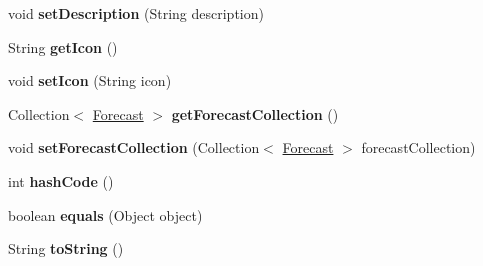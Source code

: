 \begin{DoxyCompactItemize}
\item 
\hypertarget{classit_1_1polimi_1_1se_1_1calcare_1_1entities_1_1WeatherCondition_a857fa008a9f13c5f423520469976ab4a}{}void {\bfseries set\+Description} (String description)\label{classit_1_1polimi_1_1se_1_1calcare_1_1entities_1_1WeatherCondition_a857fa008a9f13c5f423520469976ab4a}

\item 
\hypertarget{classit_1_1polimi_1_1se_1_1calcare_1_1entities_1_1WeatherCondition_a0b5248c9fa248809e6a6487f71656d75}{}String {\bfseries get\+Icon} ()\label{classit_1_1polimi_1_1se_1_1calcare_1_1entities_1_1WeatherCondition_a0b5248c9fa248809e6a6487f71656d75}

\item 
\hypertarget{classit_1_1polimi_1_1se_1_1calcare_1_1entities_1_1WeatherCondition_a74ddfcb08d6757ef6203a9dfe2c38b97}{}void {\bfseries set\+Icon} (String icon)\label{classit_1_1polimi_1_1se_1_1calcare_1_1entities_1_1WeatherCondition_a74ddfcb08d6757ef6203a9dfe2c38b97}

\item 
\hypertarget{classit_1_1polimi_1_1se_1_1calcare_1_1entities_1_1WeatherCondition_ad6822dfbce9197d2bb8b2c3a6c3dd95b}{}Collection$<$ \hyperlink{classit_1_1polimi_1_1se_1_1calcare_1_1entities_1_1Forecast}{Forecast} $>$ {\bfseries get\+Forecast\+Collection} ()\label{classit_1_1polimi_1_1se_1_1calcare_1_1entities_1_1WeatherCondition_ad6822dfbce9197d2bb8b2c3a6c3dd95b}

\item 
\hypertarget{classit_1_1polimi_1_1se_1_1calcare_1_1entities_1_1WeatherCondition_a3672929152fa52e16d87f8f5c4892b71}{}void {\bfseries set\+Forecast\+Collection} (Collection$<$ \hyperlink{classit_1_1polimi_1_1se_1_1calcare_1_1entities_1_1Forecast}{Forecast} $>$ forecast\+Collection)\label{classit_1_1polimi_1_1se_1_1calcare_1_1entities_1_1WeatherCondition_a3672929152fa52e16d87f8f5c4892b71}

\item 
\hypertarget{classit_1_1polimi_1_1se_1_1calcare_1_1entities_1_1WeatherCondition_aca4e31ef321843c6245129c712e9cd98}{}int {\bfseries hash\+Code} ()\label{classit_1_1polimi_1_1se_1_1calcare_1_1entities_1_1WeatherCondition_aca4e31ef321843c6245129c712e9cd98}

\item 
\hypertarget{classit_1_1polimi_1_1se_1_1calcare_1_1entities_1_1WeatherCondition_a92a10b5697f4da18002db6aabeace184}{}boolean {\bfseries equals} (Object object)\label{classit_1_1polimi_1_1se_1_1calcare_1_1entities_1_1WeatherCondition_a92a10b5697f4da18002db6aabeace184}

\item 
\hypertarget{classit_1_1polimi_1_1se_1_1calcare_1_1entities_1_1WeatherCondition_abbfc382d672b67356d4cfd1b845c53d7}{}String {\bfseries to\+String} ()\label{classit_1_1polimi_1_1se_1_1calcare_1_1entities_1_1WeatherCondition_abbfc382d672b67356d4cfd1b845c53d7}

\end{DoxyCompactItemize}


